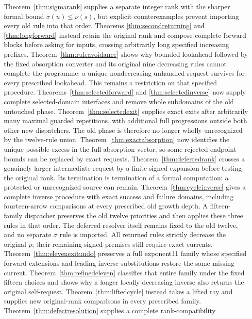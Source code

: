\documentclass[11pt]{article}
\begin{document}
Theorem~\ref{thm:sigmarank} supplies a separate integer rank with the
sharper formal bound $\sigma(u)\le\nu(s)$, but explicit counterexamples
prevent importing every old rule into that order. Theorems
\ref{thm:secondreturning} and \ref{thm:longforward} instead retain the
original rank and compose complete forward blocks before asking for
inputs, crossing arbitrarily long specified increasing prefixes.
Theorem~\ref{thm:ruleavoidance} shows why bounded lookahead followed by
the fixed absorption converter and its original nine decreasing rules
cannot complete the programme: a unique nondecreasing unhandled request
survives for every prescribed lookahead. This remains a restriction on that
specified procedure. Theorems~\ref{thm:selectedforward} and
\ref{thm:selectedinverse} now supply complete selected-domain interfaces
and remove whole subdomains of the old untouched phase.
Theorem~\ref{thm:selectedexit} supplies exact exits after arbitrarily many
maximal guarded repetitions, with additional full progressions outside
both other new dispatchers. The old phase is therefore no longer wholly
unrecognized by the twelve-rule union. Theorem~\ref{thm:exactabsorption}
now identifies the unique possible excess in the full absorption vector,
so some rejected endpoint bounds can be replaced by exact requests.
Theorem~\ref{thm:deferredrank} crosses a genuinely larger intermediate
request by a finite signed expansion before testing the original rank.
Its termination is termination of a formal computation: a protected or
unrecognized source can remain. Theorem~\ref{thm:cycleinverse} gives a
complete inverse procedure with exact success and failure domains,
including fourteen-arrow comparisons at every prescribed old growth
depth. A fifteen-family dispatcher preserves the old twelve priorities
and then applies these three rules in that order. The deferred resolver
itself remains fixed to the old twelve, and no separate $\sigma$ rule
is imported. All returned rules strictly decrease the original $\rho$;
their remaining signed premises still require exact currents.
Theorem~\ref{thm:elevenexitundo} preserves a full exponent11 family
whose specified forward extensions and leading inverse substitutions
restore the same missing current. Theorem~\ref{thm:refinedeleven}
classifies that entire family under the fixed fifteen choices and
shows why a longer locally decreasing inverse also returns the original
self-request. Theorem~\ref{thm:liftedcycle} instead takes a lifted ray
and supplies new original-rank comparisons in every prescribed family.
Theorem~\ref{thm:defectresolution} supplies a complete rank-compatibility
\end{document}
